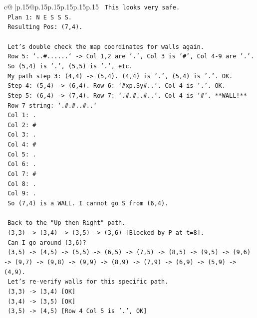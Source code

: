\documentclass{article}
\begin{document}
{\begin{supertabular}{c@{$\;$}|p{.15\linewidth}@{}p{.15\linewidth}p{.15\linewidth}p{.15\linewidth}p{.15\linewidth}p{.15\linewidth}}
{{{\texttt{  This looks very safe.} \\
\texttt{  Plan 1: N E S S S.} \\
\texttt{  Resulting Pos: (7,4).} \\
\\ 
\texttt{  Let's double check the map coordinates for walls again.} \\
\texttt{  Row 5: `..\#......` {-}> Col 1,2 are '.', Col 3 is '\#', Col 4{-}9 are '.'.} \\
\texttt{  So (5,4) is '.', (5,5) is '.', etc.} \\
\texttt{  My path step 3: (4,4) {-}> (5,4). (4,4) is '.', (5,4) is '.'. OK.} \\
\texttt{  Step 4: (5,4) {-}> (6,4). Row 6: `\#xp.Sy\#..`. Col 4 is '.'. OK.} \\
\texttt{  Step 5: (6,4) {-}> (7,4). Row 7: `.\#.\#..\#..`. Col 4 is '\#'. **WALL!**} \\
\texttt{  Row 7 string: `.\#.\#..\#..`} \\
\texttt{  Col 1: .} \\
\texttt{  Col 2: \#} \\
\texttt{  Col 3: .} \\
\texttt{  Col 4: \#} \\
\texttt{  Col 5: .} \\
\texttt{  Col 6: .} \\
\texttt{  Col 7: \#} \\
\texttt{  Col 8: .} \\
\texttt{  Col 9: .} \\
\texttt{  So (7,4) is a WALL. I cannot go S from (6,4).} \\
\\ 
\texttt{  Back to the "Up then Right" path.} \\
\texttt{  (3,3) {-}> (3,4) {-}> (3,5) {-}> (3,6) {[}Blocked by P at t=8{]}.} \\
\texttt{  Can I go around (3,6)?} \\
\texttt{  (3,5) {-}> (4,5) {-}> (5,5) {-}> (6,5) {-}> (7,5) {-}> (8,5) {-}> (9,5) {-}> (9,6) {-}> (9,7) {-}> (9,8) {-}> (9,9) {-}> (8,9) {-}> (7,9) {-}> (6,9) {-}> (5,9) {-}> (4,9).} \\
\texttt{  Let's re{-}verify walls for this specific path.} \\
\texttt{  (3,3) {-}> (3,4) {[}OK{]}} \\
\texttt{  (3,4) {-}> (3,5) {[}OK{]}} \\
\texttt{  (3,5) {-}> (4,5) {[}Row 4 Col 5 is '.', OK{]}} \\
}}}
\end{supertabular}}
\end{document}
